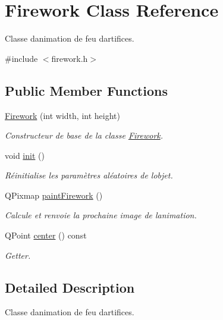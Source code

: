 \hypertarget{class_firework}{}\section{Firework Class Reference}
\label{class_firework}


Classe d\textquotesingle{}animation de feu d\textquotesingle{}artifices.  




{\ttfamily \#include $<$firework.\+h$>$}

\subsection*{Public Member Functions}
\begin{DoxyCompactItemize}
\item 
\hyperlink{class_firework_af032da470d5bca6f9a36bec0a3228b8a}{Firework} (int width, int height)
\begin{DoxyCompactList}\small\item\em Constructeur de base de la classe \hyperlink{class_firework}{Firework}. \end{DoxyCompactList}\item 
\hypertarget{class_firework_aba631b83c2df26f8bd9fa124bd711974}{}void \hyperlink{class_firework_aba631b83c2df26f8bd9fa124bd711974}{init} ()\label{class_firework_aba631b83c2df26f8bd9fa124bd711974}

\begin{DoxyCompactList}\small\item\em Réinitialise les paramètres aléatoires de l\textquotesingle{}objet. \end{DoxyCompactList}\item 
Q\+Pixmap \hyperlink{class_firework_a23dd6268486eb91b6c5cfa2279bc0b41}{paint\+Firework} ()
\begin{DoxyCompactList}\small\item\em Calcule et renvoie la prochaine image de l\textquotesingle{}animation. \end{DoxyCompactList}\item 
Q\+Point \hyperlink{class_firework_ace6e4734843019521c0e2a244e5f6c1c}{center} () const 
\begin{DoxyCompactList}\small\item\em Getter. \end{DoxyCompactList}\end{DoxyCompactItemize}


\subsection{Detailed Description}
Classe d\textquotesingle{}animation de feu d\textquotesingle{}artifices. 

